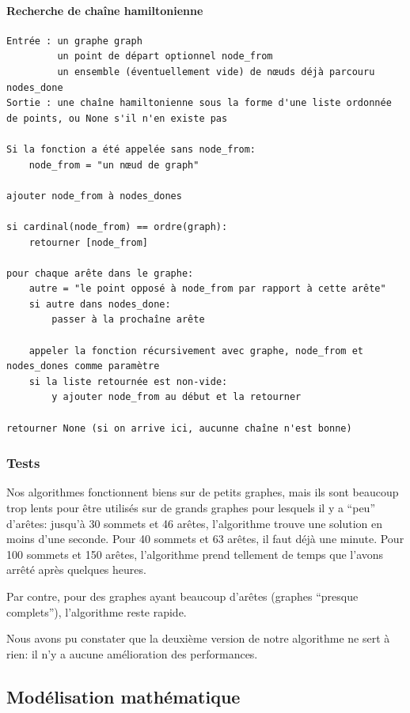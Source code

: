     \paragraph{Recherche de chaîne hamiltonienne} \mbox{}
      \begin{lstlisting}
Entrée : un graphe graph
         un point de départ optionnel node_from
         un ensemble (éventuellement vide) de nœuds déjà parcouru nodes_done
Sortie : une chaîne hamiltonienne sous la forme d'une liste ordonnée de points, ou None s'il n'en existe pas

Si la fonction a été appelée sans node_from:
    node_from = "un nœud de graph"

ajouter node_from à nodes_dones

si cardinal(node_from) == ordre(graph):
    retourner [node_from]

pour chaque arête dans le graphe:
    autre = "le point opposé à node_from par rapport à cette arête"
    si autre dans nodes_done:
        passer à la prochaîne arête

    appeler la fonction récursivement avec graphe, node_from et nodes_dones comme paramètre
    si la liste retournée est non-vide:
        y ajouter node_from au début et la retourner

retourner None (si on arrive ici, aucunne chaîne n'est bonne)
      \end{lstlisting}

  \subsubsection{Tests}
    Nos algorithmes fonctionnent biens sur de petits graphes, mais ils sont
    beaucoup trop lents pour être utilisés sur de grands graphes pour lesquels
    il y a ``peu'' d'arêtes: jusqu'à 30 sommets et 46 arêtes, l'algorithme
    trouve une solution en moins d'une seconde. Pour 40 sommets et 63 arêtes,
    il faut déjà une minute. Pour 100 sommets et 150 arêtes, l'algorithme
    prend tellement de temps que l'avons arrêté après quelques heures.

    Par contre, pour des graphes ayant beaucoup d'arêtes (graphes ``presque
    complets''), l'algorithme reste rapide.

    Nous avons pu constater que la deuxième version de notre algorithme ne sert
    à rien: il n'y a aucune amélioration des performances.

\subsection{Modélisation mathématique}

